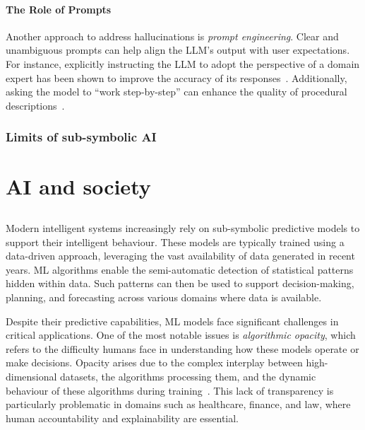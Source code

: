 \paragraph{The Role of Prompts}

Another approach to address hallucinations is \emph{prompt engineering}.
%
Clear and unambiguous prompts can help align the \gls{LLM}'s output with user expectations.
%
For instance, explicitly instructing the \gls{LLM} to adopt the perspective of a domain expert has been shown to improve the accuracy of its responses~\cite{MemmertCB24}.
%
Additionally, asking the model to ``work step-by-step'' can enhance the quality of procedural descriptions~\cite{YangWLLZC23}.


\subsubsection[Limits of sub-symbolic AI]{Limits of sub-symbolic \Gls{AI}}\label{subsubsec:limits-of-sub-symbolic-ai}
%


\section{AI and society}\label{sec:ai-and-society}
%
\subsection[Explainable AI]{}\label{subsec:xai}
%
Modern intelligent systems increasingly rely on sub-symbolic predictive models to support their intelligent behaviour.
%
These models are typically trained using a data-driven approach, leveraging the vast availability of data generated in recent years.
%
\Gls{ML} algorithms enable the semi-automatic detection of statistical patterns hidden within data.
%
Such patterns can then be used to support decision-making, planning, and forecasting across various domains where data is available.


Despite their predictive capabilities, \gls{ML} models face significant challenges in critical applications.
%
One of the most notable issues is \emph{algorithmic opacity}, which refers to the difficulty humans face in understanding how these models operate or make decisions.
%
Opacity arises due to the complex interplay between high-dimensional datasets, the algorithms processing them, and the dynamic behaviour of these algorithms during training~\cite{DBLP:journals/bigdatasociety/Burrell16}.
%
This lack of transparency is particularly problematic in domains such as healthcare, finance, and law, where human accountability and explainability are essential.


